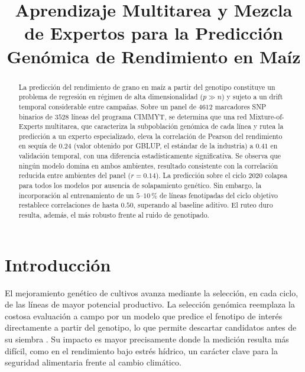 \documentclass[conference]{IEEEtran}
\begin{document}
\title{Aprendizaje Multitarea y Mezcla de Expertos para la Predicción Genómica de Rendimiento en Maíz}

\author{
\and
{}
}

\maketitle

\begin{abstract}
La predicción del rendimiento de grano en maíz a partir del genotipo constituye un problema de regresión en régimen de alta dimensionalidad ($p\gg n$) y sujeto a un drift temporal considerable entre campañas. Sobre un panel de $4612$ marcadores SNP binarios de $3528$ líneas del programa CIMMYT, se determina que una red Mixture-of-Experts multitarea, que caracteriza la subpoblación genómica de cada línea y rutea la predicción a un experto especializado, eleva la correlación de Pearson del rendimiento en sequía de $0.24$  (valor obtenido por GBLUP, el estándar de la industria) a $0.41$ en validación temporal, con una diferencia estadísticamente significativa. Se observa que ningún modelo domina en ambos ambientes, resultado consistente con la correlación reducida entre ambientes del panel ($r=0.14$). La predicción sobre el ciclo 2020 colapsa para todos los modelos por ausencia de solapamiento genético. Sin embargo, la incorporación al entrenamiento de un $5$--$10\,\%$ de líneas fenotipadas del ciclo objetivo restablece correlaciones de hasta $0.50$, superando al baseline aditivo. El ruteo duro resulta, además, el más robusto frente al ruido de genotipado.
\end{abstract}

\section{Introducción}
El mejoramiento genético de cultivos avanza mediante la selección, en cada ciclo, de las líneas de mayor potencial productivo. La selección genómica reemplaza la costosa evaluación a campo por un modelo que predice el fenotipo de interés directamente a partir del genotipo, lo que permite descartar candidatos antes de su siembra \cite{lopezcruz2021}. Su impacto es mayor precisamente donde la medición resulta más difícil, como en el rendimiento bajo estrés hídrico, un carácter clave para la seguridad alimentaria frente al cambio climático.
\end{document}
